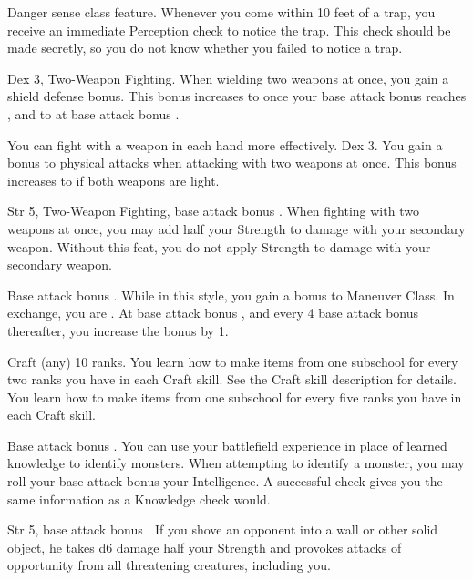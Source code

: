 \featpre Danger sense class feature.
\featben Whenever you come within 10 feet of a trap, you receive an immediate Perception check to notice the trap. This check should be made secretly, so you do not know whether you failed to notice a trap.

 Dex 3, Two-Weapon Fighting.
 When wielding two weapons at once, you gain a  shield defense bonus. This bonus increases to  once your base attack bonus reaches , and to  at base attack bonus .

You can fight with a weapon in each hand more effectively.
 Dex 3.
 You gain a  bonus to physical attacks when attacking with two weapons at once. This bonus increases to  if both weapons are light.

 Str 5, Two-Weapon Fighting, base attack bonus .
 When fighting with two weapons at once, you may add half your Strength to damage with your secondary weapon.
 Without this feat, you do not apply Strength to damage with your secondary weapon.

 Base attack bonus .
 While in this style, you gain a  bonus to Maneuver Class. In exchange, you are \immobilized. At base attack bonus , and every 4 base attack bonus thereafter, you increase the bonus by 1.

 Craft (any) 10 ranks.
 You learn how to make items from one subschool for every two ranks you have in each Craft skill. See the Craft skill description for details.
 You learn how to make items from one subschool for every five ranks you have in each Craft skill.

\featpre Base attack bonus .
\featben You can use your battlefield experience in place of learned knowledge to identify monsters. When attempting to identify a monster, you may roll your base attack bonus \add your Intelligence. A successful check gives you the same information as a Knowledge check would.

\featpre Str 5, base attack bonus .
\featben If you shove an opponent into a wall or other solid object, he takes d6 damage \add half your Strength and provokes attacks of opportunity from all threatening creatures, including you.

